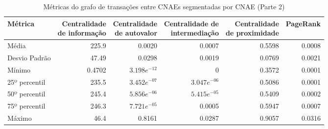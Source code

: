 \begin{table}[htb]
\centering
\caption{Métricas do grafo de transações entre CNAEs segmentadas por CNAE (Parte 2)}
\label{tab:metricas-redes:grafo-por-cnae-especificas2}
\begin{tabular}{l|rrrrr}
\toprule
Métrica & \shortstack{Centralidade\\de informação} & \shortstack{Centralidade\\de autovalor} & \shortstack{Centralidade de\\intermediação} & \shortstack{Centralidade\\de proximidade} & PageRank \\
\midrule
Média         & 225.9    &         0.0020 &         0.0007 & 0.5598 & 0.0008 \\
Desvio Padrão &  47.49   &         0.0298 &         0.0019 & 0.0769 & 0.0021 \\
Mínimo        &   0.4702 & $3.198e^{-12}$ &              0 & 0.3572 & 0.0001 \\
25º percentil & 235.5    & $3.452e^{-07}$ & $3.047e^{-06}$ & 0.5086 & 0.0001 \\
50º percentil & 245.4    & $5.856e^{-06}$ & $5.415e^{-05}$ & 0.5409 & 0.0002 \\
75º percentil & 246.3    & $7.721e^{-05}$ &         0.0005 & 0.5947 & 0.0007 \\
Máximo        & 46.4     &         0.8161 &         0.0287 & 0.9057 & 0.0316 \\
\bottomrule
\end{tabular}
\fdadospesquisa
\end{table}
